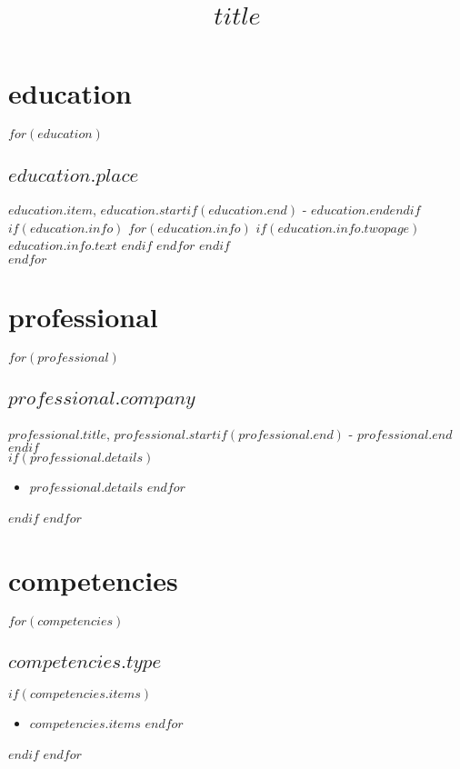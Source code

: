 \documentclass[11pt, A4]{article}
\title{$title$}
\begin{document}
\maketitle

\section{education}
$for(education)$
\subsection{$education.place$}
$education.item$, $education.start$$if(education.end)$ - $education.end$$endif$
$if(education.info)$ $for(education.info)$ $if(education.info.twopage)$ $education.info.text$ $endif$ $endfor$ $endif$ \\[.25cm]
$endfor$

\section{professional}
$for(professional)$
\subsection{$professional.company$}
$professional.title$,
$professional.start$$if(professional.end)$ - $professional.end$$endif$\\[.25cm]
$if(professional.details)$
\begin{itemize}
$for(professional.details)$
\item $professional.details$
$endfor$
\end{itemize}
$endif$
$endfor$

\section{competencies}
$for(competencies)$
\subsection{$competencies.type$}
$if(competencies.items)$
\begin{itemize}
$for(competencies.items)$
\item $competencies.items$
$endfor$
\end{itemize}
$endif$
$endfor$
\end{document}
